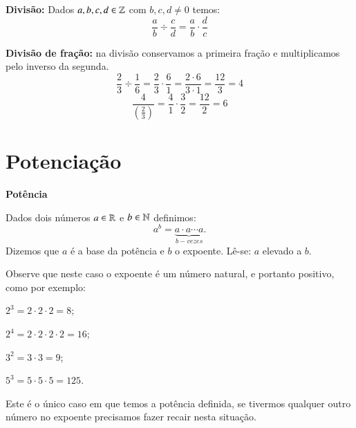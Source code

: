  \vskip0.3cm

 \colorbox{azul}{
 \begin{minipage}{0.9\linewidth}
 \begin{center}
  \textbf{Divisão:} Dados $a, b, c, d \in \mathbb{Z}$ com $b, c, d \neq 0$ temos:
 \[\frac{a}{b} \div \frac{c}{d}= \frac{a}{b} \cdot \frac{d}{c} \]
 \end{center}
 \end{minipage}}

 \vskip0.3cm
 \begin{exem}
  \textbf{Divisão de fração:} na divisão conservamos a primeira fração e multiplicamos pelo inverso da segunda.
   \[\frac{2}{3} \div \frac{1}{6}= \frac{2}{3} \cdot \frac{6}{1}= \frac{2 \cdot 6}{3 \cdot 1}= \frac{12}{3}= 4 \]
   \[\frac{4}{\left(\frac{2}{3}\right)}= \frac{4}{1} \cdot \frac{3}{2}= \frac{12}{2}=6\]
 \end{exem}


 \vskip0.3cm


 \section{Potenciação}

  \vskip0.3cm

 \textbf{Potência}

 \vskip0.3cm

 \colorbox{azul}{
 \begin{minipage}{0.9\linewidth}
 \begin{center}
  Dados dois números $a \in \mathbb{R}$ e $b \in \mathbb{N}$ definimos:
 \[a^b= \underbrace{a \cdot a \cdots a}_{b - vezes} .\]
  Dizemos que $a$ é a base da potência e $b$ o expoente. Lê-se: $a$ elevado a $b$.
 \end{center}
 \end{minipage}}

 \vskip0.3cm

 \begin{exem}
 Observe que neste caso o expoente é um número natural, e portanto positivo, como por exemplo:

  $2^3= 2 \cdot 2 \cdot 2= 8$;

  $2^4=2 \cdot 2 \cdot 2 \cdot  2= 16$;

  $3^2= 3 \cdot 3= 9$;

  $5^3= 5 \cdot 5 \cdot 5= 125$.

  Este é o único caso em que temos a potência definida, se tivermos qualquer outro número no expoente precisamos fazer recair nesta situação.
 \end{exem}


